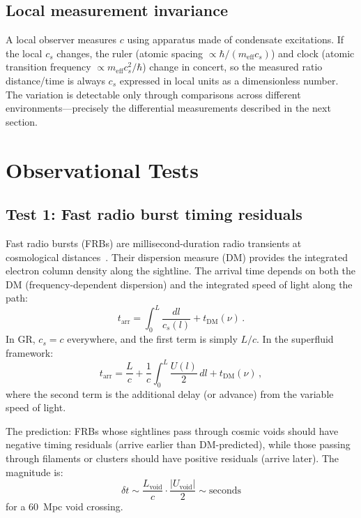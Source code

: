 \documentclass[12pt, a4paper]{article}
\newcommand{\meff}{m_{\mathrm{eff}}}
\begin{document}
\subsection{Local measurement invariance}

A local observer measures $c$ using apparatus made
of condensate excitations. If the local $c_s$ changes,
the ruler (atomic spacing $\propto \hbar/(\meff c_s)$)
and clock (atomic transition frequency
$\propto \meff c_s^2/\hbar$) change in concert, so
the measured ratio distance/time is always $c_s$
expressed in local units as a dimensionless number.
The variation is detectable only through comparisons
across different environments---precisely the
differential measurements described in the next
section.


\section{Observational Tests}
\label{sec:tests}

\subsection{Test 1: Fast radio burst timing residuals}

Fast radio bursts (FRBs) are millisecond-duration
radio transients at cosmological
distances~\cite{lorimer_2007,chatterjee_2017}. Their
dispersion measure (DM) provides the integrated
electron column density along the sightline. The
arrival time depends on both the DM (frequency-dependent
dispersion) and the integrated speed of light along
the path:
\begin{equation}
    t_{\mathrm{arr}} = \int_0^L \frac{dl}{c_s(l)}
    + t_{\mathrm{DM}}(\nu)\,.
\label{eq:t_arr}
\end{equation}
In GR, $c_s = c$ everywhere, and the first term is
simply $L/c$. In the superfluid framework:
\begin{equation}
    t_{\mathrm{arr}} = \frac{L}{c}
    + \frac{1}{c}\int_0^L \frac{U(l)}{2}\,dl
    + t_{\mathrm{DM}}(\nu)\,,
\label{eq:t_arr_svt}
\end{equation}
where the second term is the additional delay (or
advance) from the variable speed of light.

The prediction: FRBs whose sightlines pass through
cosmic voids should have negative timing residuals
(arrive earlier than DM-predicted), while those
passing through filaments or clusters should have
positive residuals (arrive later). The magnitude is:
\begin{equation}
    \delta t \sim \frac{L_{\mathrm{void}}}{c}
    \cdot \frac{|U_{\mathrm{void}}|}{2}
    \sim \text{seconds}
\label{eq:dt_frb}
\end{equation}
for a 60~Mpc void crossing.
\end{document}
